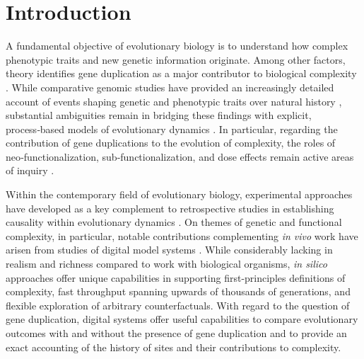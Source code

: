 \section{Introduction} \label{sec:introduction}

A fundamental objective of evolutionary biology is to understand how complex phenotypic traits and new genetic information originate.
Among other factors, theory identifies gene duplication as a major contributor to biological complexity \citep{Zhang2003,Otto2000,Wagner2008,Wagner2007,Crow:2006role,Magadum:2013wu,Metz:chromosomeDuplication1947}.
While comparative genomic studies have provided an increasingly detailed account of events shaping genetic and phenotypic traits over natural history \citep{Zhang2014}, substantial ambiguities remain in bridging these findings with explicit, process‑based models of evolutionary dynamics \citep{Welch2016}.
In particular, regarding the contribution of gene duplications to the evolution of complexity, the roles of neo‑functionalization, sub‑functionalization, and dose effects remain active areas of inquiry \citep{Innan2010}.

Within the contemporary field of evolutionary biology, experimental approaches have developed as a key complement to retrospective studies in establishing causality within evolutionary dynamics \citep{Kawecki2012}.
On themes of genetic and functional complexity, in particular, notable contributions complementing \textit{in vivo} work have arisen from studies of digital model systems \citep{Fortuna2022}.
While considerably lacking in realism and richness compared to work with biological organisms, \textit{in silico} approaches offer unique capabilities in supporting first-principles definitions of complexity, fast throughput spanning upwards of thousands of generations, and flexible exploration of arbitrary counterfactuals.
With regard to the question of gene duplication, digital systems offer useful capabilities to compare evolutionary outcomes with and without the presence of gene duplication and to provide an exact accounting of the history of sites and their contributions to complexity.

